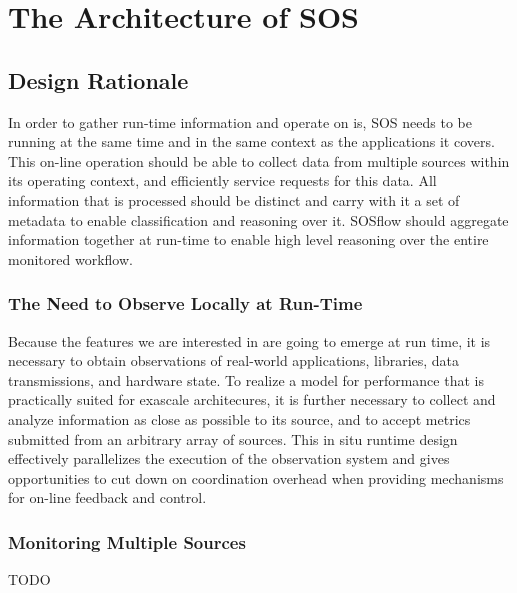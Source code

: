 
\section{The Architecture of SOS}

\subsection{Design Rationale}

In order to gather run-time information and operate on is, SOS needs to be
running at the same time and in the same context as the applications it covers.
%
This on-line operation should be able to collect data from multiple sources
within its operating context, and efficiently service requests for this data.
%
All information that is processed should be distinct and carry with it a
set of metadata to enable classification and reasoning over it.
%
SOSflow should aggregate information together at run-time to enable high level
reasoning over the entire monitored workflow.

\subsubsection{The Need to Observe Locally at Run-Time}

Because the features we are interested in are going to emerge at run
time, it is necessary to obtain observations of real-world
applications, libraries, data transmissions, and hardware state.
%
To realize a model for performance that is practically suited for
exascale architecures, it is further necessary to collect and analyze
information as close as possible to its source, and to accept metrics
submitted from an arbitrary array of sources.
%
This in situ runtime design effectively parallelizes the execution of
the observation system and gives opportunities to cut down on
coordination overhead when providing mechanisms for on-line feedback
and control.

\subsubsection{Monitoring Multiple Sources}
TODO


